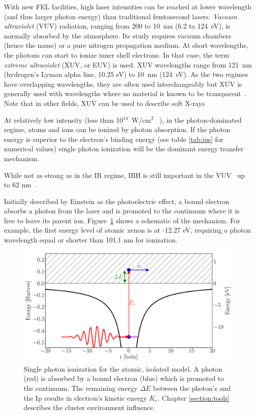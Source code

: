 With new FEL facilities, high laser intensities can be reached at
lower wavelength (and thus larger photon energy) than traditional
femtosecond lasers. \textit{Vacuum ultraviolet} (VUV) radiation, ranging from 200 to
10~nm (6.2 to 124~eV), is normally absorbed by the atmosphere. Its study
requires vacuum chambers (hence the name) or a pure nitrogen propagation medium.
At short wavelengths, the photons can start to ionize inner shell electrons. In
that case, the term \textit{extreme ultraviolet} (XUV, or EUV) is used. XUV wavelengths
range from 121~nm (hydrogen's Lyman alpha line, 10.25 eV) to 10~nm (124~eV).
As the two regimes have overlapping wavelengths, they are often used
interchangeably but XUV is generally used with wavelengths where no
material is known to be transparent~\cite{Laane2009}. Note that in other fields,
XUV can be used to describe soft X-rays~\cite{Eichmeier2008,iso21348}

At relatively low intensity (less than 10$^{14}$~W/cm$^2$
~\cite{Ramunno2008}), in the photon-dominated regime, atoms and ions
can be ionized by photon absorption. If the photon energy is superior to the
electron's binding energy (see table \ref{tab:ips} for numerical values) single
photon ionization will be the dominant energy transfer mechanism.

While not as strong as in the IR regime, IBH is still important in the
VUV~\cite{Krainov2000} up to 62 nm~\cite{Georgescu2007}.



Initially described by Einstein as the photoelectric effect, a bound electron
absorbs a photon from the laser and is promoted to the continuum where it is
free to leave its parent ion. Figure~\ref{fig:ionization:single} shows a
schematic of the mechanism. For example, the first energy level of atomic
xenon is at -12.27 eV, requiring a photon wavelength equal or shorter than
101.1 nm for ionization.


\begin{figure}
 \centering
 \includegraphics[width=\figurewidth]{figures/ionization_single}
 \caption{Single photon ionization for the atomic, isolated model. A photon
          (red) is absorbed by a bound electron (blue) which is promoted to
          the continuum. The remaining energy $\Delta E$ between the photon's
          and the Ip results in electron's kinetic energy $K_e$.
          Chapter \ref{section:tools} describes the cluster environment
          influence.}
 \label{fig:ionization:single}
\end{figure}

